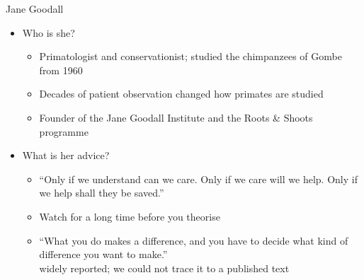 \documentclass[aspectratio=169]{beamer}
\begin{document}
\begin{frame}{Jane Goodall}
  \begin{itemize}
    \item Who is she?
      \begin{itemize}
        \item Primatologist and conservationist; studied the chimpanzees of Gombe from 1960
        \item Decades of patient observation changed how primates are studied
        \item Founder of the Jane Goodall Institute and the Roots \& Shoots programme
      \end{itemize}

    \item What is her advice?
      \begin{itemize}
        \item ``Only if we understand can we care.  Only if we care will we help.  Only if we help shall they be saved.''
\\ \hfill \citep{goodall:40years}

        \item Watch for a long time before you theorise
  \\ \hfill   \citep{goodall:shadowsofman,goodall:chimpanzees}
        \item ``What you do makes a difference, and you have to decide what kind of difference you want to make.''
          \\ \hfill {\footnotesize widely reported; we could not trace it to a published text}
      \end{itemize}
  \end{itemize}
\end{frame}
\end{document}
